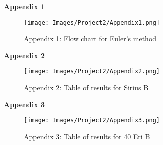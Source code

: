 \documentclass[10pt]{article}
\begin{document}
{\textbf{\Large Appendix 1}
\begin{figure}[hb]
\texttt{[image: Images/Project2/Appendix1.png]} \centering \caption*{\footnotesize Appendix 1: Flow chart for Euler's method} \end{figure}

\bigskip\bigskip\bigskip
\bigskip \bigskip \bigskip
\bigskip \bigskip \bigskip
\bigskip \bigskip \bigskip
\bigskip \bigskip \bigskip
\bigskip \bigskip \bigskip
\textbf{\Large Appendix 2}
\begin{figure}[hb]
\texttt{[image: Images/Project2/Appendix2.png]} \centering \caption*{\footnotesize Appendix 2: Table of results for Sirius B} \end{figure}

\bigskip\bigskip\bigskip\bigskip\bigskip\bigskip\bigskip\bigskip\bigskip\bigskip\bigskip\bigskip
\textbf{\Large Appendix 3}
\begin{figure}[hb]
\texttt{[image: Images/Project2/Appendix3.png]} \centering \caption*{\footnotesize Appendix 3: Table of results for 40 Eri B} \end{figure}

}
\end{document}
